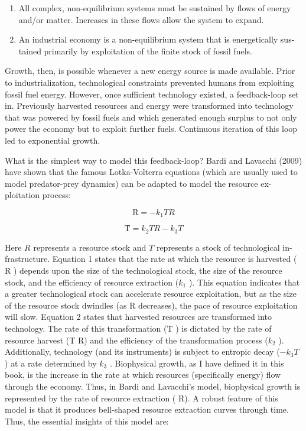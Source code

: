 \documentclass[
]{book}
\begin{document}
\begin{enumerate}
\def\labelenumi{\arabic{enumi}.}
\item
  All complex, non-equilibrium systems must be sustained by flows of energy
  and/or matter. Increases in these flows allow the system to expand.
\item
  An industrial economy is a non-equilibrium system that is energetically sus-
  tained primarily by exploitation of the finite stock of fossil fuels.
\end{enumerate}

Growth, then, is possible whenever a new energy source is made available. Prior
to industrialization, technological constraints prevented humans from exploiting
fossil fuel energy. However, once sufficient technology existed, a feedback-loop set
in. Previously harvested resources and energy were transformed into technology that
was powered by fossil fuels and which generated enough surplus to not only power
the economy but to exploit further fuels. Continuous iteration of this loop led to
exponential growth.

What is the simplest way to model this feedback-loop? Bardi and Lavacchi
(2009) have shown that the famous Lotka-Volterra equations (which are usually
used to model predator-prey dynamics) can be adapted to model the resource ex-
ploitation process:

\[ Ṙ = −k_1 T R\]

\[Ṫ = k_2 T R − k_3 T\]

Here \(R\) represents a resource stock and \(T\) represents a stock of technological in-
frastructure. Equation 1 states that the rate at which the resource is harvested ( \(Ṙ\) )
depends upon the size of the technological stock, the size of the resource stock, and
the efficiency of resource extraction (\(k_1\) ).
This equation indicates that a greater technological stock can accelerate
resource exploitation, but as the size of the resource
stock dwindles (as R decreases), the pace of resource exploitation will slow.
Equation 2 states that harvested resources are transformed into technology. The
rate of this transformation (\(Ṫ\) ) is dictated by the rate of resource harvest (T R) and
the efficiency of the transformation process (\(k_2\) ). Additionally, technology (and its
instruments) is subject to entropic decay (\(−k_3 T\) ) at a rate determined by \(k_3\) .
Biophysical growth, as I have defined it in this book, is the increase in the rate
at which resources (specifically energy) flow through the economy. Thus, in Bardi
and Lavacchi's model, biophysical growth is represented by the rate of resource
extraction ( \(Ṙ\)).
A robust feature of this model is that it produces bell-shaped resource
extraction curves through time.
Thus, the essential
insights of this model are:
\end{document}
